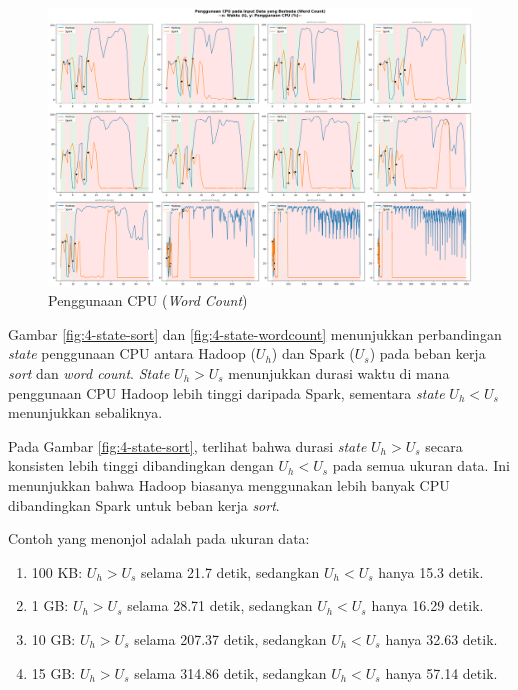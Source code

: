 \begin{landscape}
\begin{figure}[h]
    \centering
    \includegraphics[height=0.6\linewidth]{figures/ch04/4-penggunaan-cpu-all-wordcount.png}
    \caption{Penggunaan CPU (\textit{Word Count})}
    \label{fig:4-penggunaan-cpu-all-wordcount}
\end{figure}
\end{landscape}

Gambar \ref{fig:4-state-sort} dan \ref{fig:4-state-wordcount} menunjukkan perbandingan \textit{state} penggunaan CPU antara Hadoop ($U_h$) dan Spark ($U_s$) pada beban kerja \textit{sort} dan \textit{word count}. \textit{State} $U_h > U_s$ menunjukkan durasi waktu di mana penggunaan CPU Hadoop lebih tinggi daripada Spark, sementara \textit{state} $U_h < U_s$ menunjukkan sebaliknya.

Pada Gambar \ref{fig:4-state-sort}, terlihat bahwa durasi \textit{state} $U_h > U_s$ secara konsisten lebih tinggi dibandingkan dengan $U_h < U_s$ pada semua ukuran data. Ini menunjukkan bahwa Hadoop biasanya menggunakan lebih banyak CPU dibandingkan Spark untuk beban kerja \textit{sort}.

Contoh yang menonjol adalah pada ukuran data:
\begin{enumerate}
	\item 100 KB: $U_h > U_s$ selama 21.7 detik, sedangkan $U_h < U_s$ hanya 15.3 detik.
	\item 1 GB: $U_h > U_s$ selama 28.71 detik, sedangkan $U_h < U_s$ hanya 16.29 detik.
	\item 10 GB: $U_h > U_s$ selama 207.37 detik, sedangkan $U_h < U_s$ hanya 32.63 detik.
	\item 15 GB: $U_h > U_s$ selama 314.86 detik, sedangkan $U_h < U_s$ hanya 57.14 detik.
\end{enumerate}

